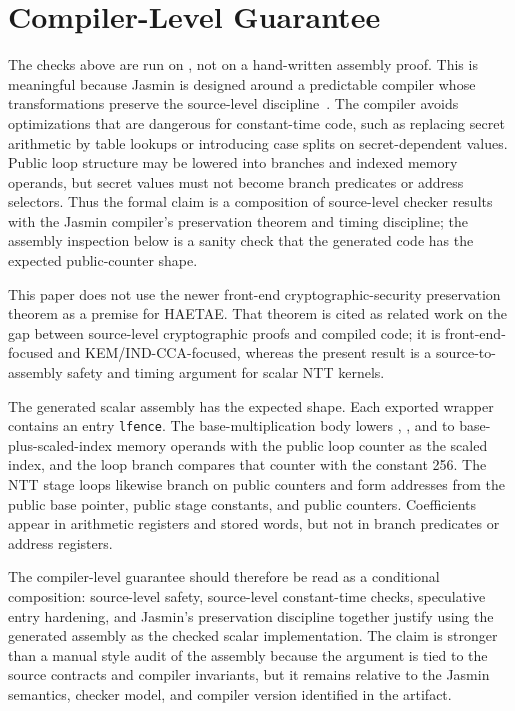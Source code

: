 \documentclass[10pt,twocolumn]{article}
\newcommand{\jasmin}{Jasmin}
\newcommand{\ct}{constant-time}
\begin{document}
\section{Compiler-Level Guarantee}

The checks above are run on , not on a hand-written
assembly proof.  This is meaningful because \jasmin{} is designed around a
predictable compiler whose transformations preserve the source-level
discipline~\cite{Jasmin2017,LastMile2020,JasminFramework2026}.  The compiler
avoids optimizations that are
dangerous for \ct{} code, such as replacing secret arithmetic by table lookups
or introducing case splits on secret-dependent values.  Public loop structure
may be lowered into branches and indexed memory operands, but secret values must
not become branch predicates or address selectors.  Thus the formal claim is a
composition of source-level checker results with the \jasmin{} compiler's
preservation theorem and timing discipline; the assembly inspection below is a
sanity check that the generated code has the expected public-counter shape.

This paper does not use the newer front-end cryptographic-security
preservation theorem as a premise for HAETAE.  That theorem is cited as related
work on the gap between source-level cryptographic proofs and compiled code; it
is front-end-focused and KEM/IND-CCA-focused, whereas the present result is a
source-to-assembly safety and timing argument for scalar NTT kernels.

The generated scalar assembly has the expected shape.  Each exported wrapper
contains an entry \texttt{lfence}.  The base-multiplication body lowers
, , and  to base-plus-scaled-index memory
operands with the public loop counter as the scaled index, and the loop branch
compares that counter with the constant 256.  The NTT stage loops likewise
branch on public counters and form addresses from the public base pointer,
public stage constants, and public counters.  Coefficients appear in arithmetic
registers and stored words, but not in branch predicates or address registers.

The compiler-level guarantee should therefore be read as a conditional
composition: source-level safety, source-level \ct{} checks, speculative entry
hardening, and \jasmin{}'s preservation discipline together justify using the
generated assembly as the checked scalar implementation.  The claim is stronger
than a manual style audit of the assembly because the argument is tied to the
source contracts and compiler invariants, but it remains relative to the
\jasmin{} semantics, checker model, and compiler version identified in the
artifact.
\end{document}
